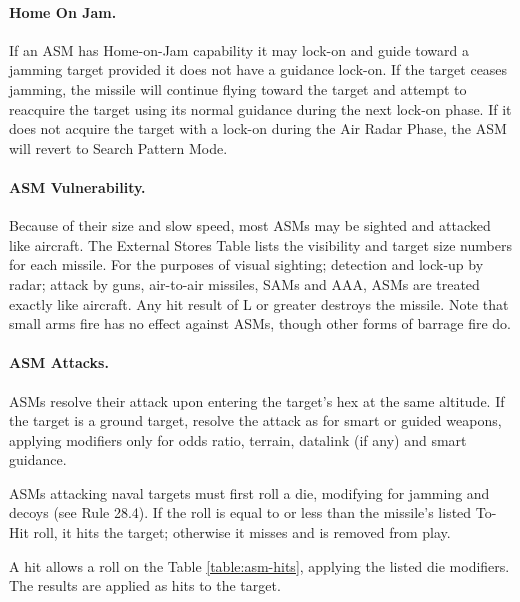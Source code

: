 \begin{advancedrules}
\paragraph{Home On Jam.} If an ASM has Home-on-Jam capability it may lock-on and guide toward a jamming target provided it does not have a guidance lock-on. If the target ceases jamming, the missile will continue flying toward the target and attempt to reacquire the target using its normal guidance during the next lock-on phase.  If it does not acquire the target with a lock-on during the Air Radar Phase, the ASM will revert to Search Pattern Mode.  

\paragraph{ASM Vulnerability.}  Because of their size and slow speed, most ASMs may be sighted and attacked like aircraft.  The External Stores Table lists the visibility and target size numbers for each missile.  For the purposes of visual sighting; detection and lock-up by radar; attack by guns, air-to-air missiles, SAMs and AAA, ASMs are treated exactly like aircraft.  Any hit result of L or greater destroys the missile.  Note that small arms fire has no effect against ASMs, though other forms of barrage fire do.

\paragraph{ASM Attacks.} ASMs resolve their attack upon entering the target's hex at the same altitude.  If the target is a ground target, resolve the attack as for smart or guided weapons, applying modifiers only for odds ratio, terrain, datalink (if any) and smart guidance.

ASMs attacking naval targets must first roll a die, modifying for jamming and decoys (see Rule 28.4).  If the roll is equal to or less than the missile's listed To-Hit roll, it hits the target; otherwise it misses and is removed from play. 

A hit allows a roll on the Table \ref{table:asm-hits}, applying the listed die modifiers.  The results are applied as hits to the target.



\end{advancedrules}
